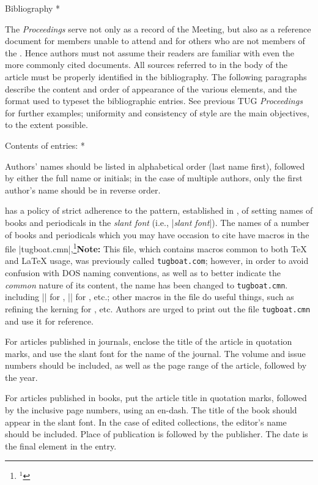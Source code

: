 \subhead * Bibliography *

The {\sl Proceedings\/} serve not only as a record of the Meeting, but
also as a reference document for members unable to attend and for others
who are not members of the \TUG.  Hence authors must not assume their
readers are familiar with even the more commonly cited documents.  All
sources referred to in the body of the article must be properly
identified in the bibliography.  The following paragraphs describe the
content and order of appearance of the various elements, and the format
used to typeset the bibliographic entries.  See previous TUG {\sl
Proceedings\/} for further examples; uniformity and consistency of style
are the main objectives, to the extent possible.

\subsubhead * Contents of entries: *

Authors' names should be listed in alphabetical order (last name first),
followed by either the full name or initials; in the case of multiple
authors, only the first author's name should be in reverse order.

\TUB\/ has a policy of strict adherence to the pattern, established in
\TB, of setting names of books and periodicals in the {\sl slant font\/}
(i.e., |{\sl slant font\/}|).  The names of a number of books and
periodicals which you may have occasion to cite have macros in the file
|tugboat.cmn|,\footnote{$^1$}{{\bf Note:} This file, which contains
macros common to both \TeX{} and \LaTeX{} usage, was previously called
{\tt tugboat.com}; however, in order to avoid confusion with {\SMC DOS}
naming conventions, as well as to better indicate the {\it common\/}
nature of its content, the name has been changed to {\tt tugboat.cmn}.}
including |\TUB| for \TUB, |\TB| for \TB, etc.; other
macros in the file do useful things, such as refining the kerning for
\AW, etc.  Authors are urged to print out the file {\tt tugboat.cmn}
and use it for reference.

For articles published in journals, enclose the title of the article in
quotation marks, and use the slant font for the name of the journal.
The volume and issue numbers should be included, as well as the page
range of the article, followed by the year.

For articles published in books, put the article title in quotation
marks, followed by the inclusive page numbers, using an en-dash.  The
title of the book should appear in the slant font.  In the case of
edited collections, the editor's name should be included.  Place of
publication is followed by the publisher.  The date is the final element
in the entry.

